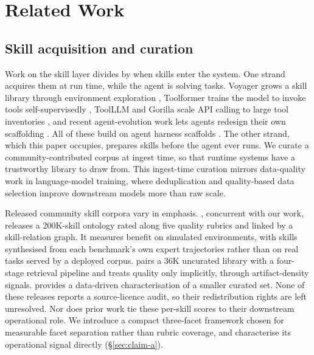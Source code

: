 \section{Related Work}
\label{sec:related}

\subsection{Skill acquisition and curation}

Work on the skill layer divides by when skills enter
the system.  One strand acquires them at run time, while the
agent is solving tasks.  Voyager grows a skill library through
environment exploration \citep{Wang2023Voyager}, Toolformer
trains the model to invoke tools self-supervisedly
\citep{Schick2023Toolformer}, ToolLLM and Gorilla scale API
calling to large tool inventories
\citep{Qin2024ToolLLM,Patil2023Gorilla}, and recent
agent-evolution work lets agents redesign their own scaffolding
\citep{Zhang2024Memento,AEvolve2025}.  All of these build on
agent harness scaffolds \citep{Yao2023ReAct,Shinn2023Reflexion}.
The other strand, which this paper occupies, prepares skills
before the agent ever runs.  We curate a
community-contributed corpus at ingest time, so that runtime
systems have a trustworthy library to draw from.  This
ingest-time curation mirrors data-quality work in language-model
training, where deduplication \citep{Lee2022Dedup} and
quality-based data selection \citep{Zhou2023LIMA} improve
downstream models more than raw scale.

Released community skill corpora vary in emphasis.
\citet{SkillNet2026}, concurrent with our work, releases a
200K-skill ontology rated along five quality rubrics and linked
by a skill-relation graph.  It measures benefit on
simulated environments, with skills synthesised from each
benchmark's own expert trajectories rather than on real tasks
served by a deployed corpus.  \citet{SkillFlow2026} pairs a 36K
uncurated library with a four-stage retrieval pipeline and
treats quality only implicitly, through artifact-density
signals.
\citet{AgentSkillsDataAnalysis2026} provides a data-driven
characterisation of a smaller curated set.  None of these releases
reports a source-licence audit, so their redistribution rights are
left unresolved.  Nor does prior work tie these per-skill scores to
their downstream operational role.  We introduce a
compact three-facet framework chosen for measurable facet
separation rather than rubric coverage, and characterise its
operational signal directly (\S\ref{sec:claim-a}).

